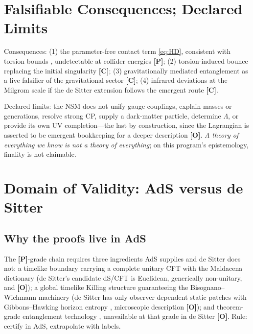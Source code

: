 \documentclass[11pt]{article}
\theoremstyle{definition}
\newcommand{\pP}{\textbf{[P]}}
\newcommand{\pC}{\textbf{[C]}}
\newcommand{\pO}{\textbf{[O]}}
\begin{document}
\section{Falsifiable Consequences; Declared Limits}

Consequences: (1) the parameter-free contact term \eqref{eq:HD},
consistent with torsion bounds \cite{KRT2008,Shapiro2002}, undetectable at
collider energies \pP{}; (2) torsion-induced bounce replacing the initial
singularity \cite{Trautman1973,Poplawski2010} \pC{}; (3) gravitationally
mediated entanglement as a live falsifier of the gravitational sector
\cite{Bose2017,MarlettoVedral2017} \pC{}; (4) infrared deviations at the
Milgrom scale if the de Sitter extension follows the emergent route
\cite{Verlinde2017,Milgrom1983} \pC{}.

Declared limits: the NSM does not unify gauge couplings, explain masses or
generations, resolve strong CP, supply a dark-matter particle, determine
$\Lambda$, or provide its own UV completion---the last by construction,
since the Lagrangian is asserted to be emergent bookkeeping for a deeper
description \pO{}. \emph{A theory of everything we know is not a theory of
everything}; on this program's epistemology, finality is not claimable.

\appendix

\section{Domain of Validity: AdS versus de Sitter}
\label{app:adsds}

\subsection{Why the proofs live in AdS}
The \pP{}-grade chain requires three ingredients AdS supplies and de
Sitter does not: a timelike boundary carrying a complete unitary CFT with
the Maldacena dictionary \cite{Maldacena1998} (de Sitter's candidate
dS/CFT \cite{Strominger2001} is Euclidean, generically non-unitary, and
\pO{}); a global timelike Killing structure guaranteeing the
Bisognano--Wichmann machinery (de Sitter has only observer-dependent
static patches with Gibbons--Hawking horizon entropy
\cite{GibbonsHawking1977}, microscopic description \pO{}); and
theorem-grade entanglement technology
\cite{RyuTakayanagi2006,FLM2013,EngelhardtWall2015}, unavailable at that
grade in de Sitter \pO{}. Rule: certify in AdS, extrapolate with labels.
\end{document}
